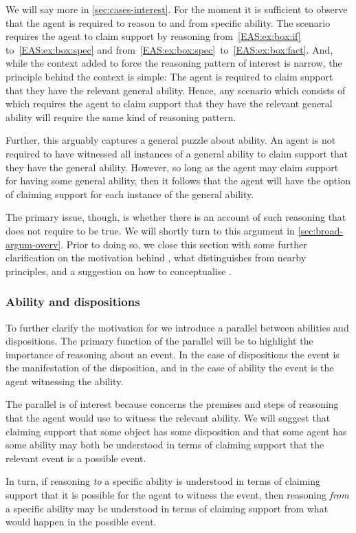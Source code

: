 \begin{note}[Point]
  We will say more in \autoref{sec:cases-interest}.
  For the moment it is sufficient to observe that the agent is required to reason to and from specific ability.
  The scenario requires the agent to claim support by reasoning from~\ref{EAS:ex:box:if} to~\ref{EAS:ex:box:spec} and from~\ref{EAS:ex:box:spec}~to~\ref{EAS:ex:box:fact}.
  And, while the context added to force the reasoning pattern of interest is narrow, the principle behind the context is simple:
  The agent is required to claim support that they have the relevant general ability.
  Hence, any scenario which consists of \gsi{-} which requires the agent to claim support that they have the relevant general ability will require the same kind of reasoning pattern.

  Further, this arguably captures a general puzzle about ability.
  An agent is not required to have witnessed all instances of a general ability to claim support that they have the general ability.
  However, so long as the agent may claim support for having some general ability, then it follows that the agent will have the option of claiming support for each instance of the general ability.

  The primary issue, though, is whether there is an account of such reasoning that does not require \EAS{} to be true.
  We will shortly turn to this argument in \autoref{sec:broad-argum-overv}.
  Prior to doing so, we close this section with some further clarification on the motivation behind \EAS{}, what distinguishes \EAS{} from nearby principles, and a suggestion on how to conceptualise \EAS{}.
\end{note}

\subsubsection{Ability and dispositions}

\begin{note}[Parallel]
  To further clarify the motivation for \EAS{} we introduce a parallel between abilities and dispositions.
  The primary function of the parallel will be to highlight the importance of reasoning about an event.
  In the case of dispositions the event is the manifestation of the disposition, and in the case of ability the event is the agent witnessing the ability.

  The parallel is of interest because \EAS{} concerns the premises and steps of reasoning that the agent would use to witness the relevant ability.
  We will suggest that claiming support that some object has some disposition and that some agent has some ability may both be understood in terms of claiming support that the relevant event is a possible event.

  In turn, if reasoning \emph{to} a specific ability is understood in terms of claiming support that it is possible for the agent to witness the event, then reasoning \emph{from} a specific ability may be understood in terms of claiming support from what would happen in the possible event.
  \end{note}

